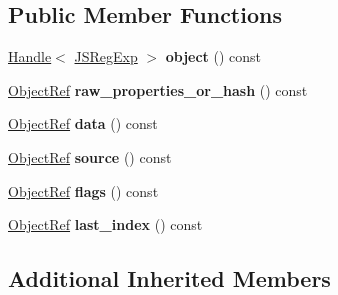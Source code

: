 \subsection*{Public Member Functions}
\begin{DoxyCompactItemize}
\item 
\mbox{\label{classv8_1_1internal_1_1compiler_1_1JSRegExpRef_a4320da9fc471366f7590940f5120468b}} 
\mbox{\hyperlink{classv8_1_1internal_1_1Handle}{Handle}}$<$ \mbox{\hyperlink{classv8_1_1internal_1_1JSRegExp}{J\+S\+Reg\+Exp}} $>$ {\bfseries object} () const
\item 
\mbox{\label{classv8_1_1internal_1_1compiler_1_1JSRegExpRef_a60356c0d53926af790587f07d9e69c2d}} 
\mbox{\hyperlink{classv8_1_1internal_1_1compiler_1_1ObjectRef}{Object\+Ref}} {\bfseries raw\+\_\+properties\+\_\+or\+\_\+hash} () const
\item 
\mbox{\label{classv8_1_1internal_1_1compiler_1_1JSRegExpRef_af8000b836a2e9963961cdd85357ba61d}} 
\mbox{\hyperlink{classv8_1_1internal_1_1compiler_1_1ObjectRef}{Object\+Ref}} {\bfseries data} () const
\item 
\mbox{\label{classv8_1_1internal_1_1compiler_1_1JSRegExpRef_a3435bb10c5c35b3aa37170b50e791e03}} 
\mbox{\hyperlink{classv8_1_1internal_1_1compiler_1_1ObjectRef}{Object\+Ref}} {\bfseries source} () const
\item 
\mbox{\label{classv8_1_1internal_1_1compiler_1_1JSRegExpRef_af743940c82cf451c633092a621a88617}} 
\mbox{\hyperlink{classv8_1_1internal_1_1compiler_1_1ObjectRef}{Object\+Ref}} {\bfseries flags} () const
\item 
\mbox{\label{classv8_1_1internal_1_1compiler_1_1JSRegExpRef_aaf1f3defc3133a0956e373c5c8c05c57}} 
\mbox{\hyperlink{classv8_1_1internal_1_1compiler_1_1ObjectRef}{Object\+Ref}} {\bfseries last\+\_\+index} () const
\end{DoxyCompactItemize}
\subsection*{Additional Inherited Members}


